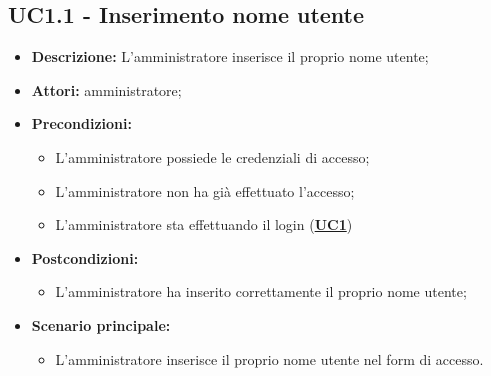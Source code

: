 \documentclass[5pt]{article}
\begin{document}
\subsection{UC1.1 - Inserimento nome utente}
\label{sec:UC1.1}
\begin{itemize}
	\item \textbf{Descrizione:} L’amministratore inserisce il proprio nome utente;
	\item \textbf{Attori:} amministratore;
	\item \textbf{Precondizioni:} 
	\begin{itemize}
		\item L’amministratore possiede le credenziali di accesso;
		\item L’amministratore non ha già effettuato l’accesso;
		\item L’amministratore sta effettuando il login (\hyperref[sec:UC1]{\textbf{UC1}})
	\end{itemize}
	\item \textbf{Postcondizioni:} 
	\begin{itemize}
		\item L’amministratore ha inserito correttamente il proprio nome utente;
	\end{itemize}
	\item \textbf{Scenario principale:} 
	\begin{itemize}
		\item L’amministratore inserisce il proprio nome utente nel form di accesso.
	\end{itemize}
\end{itemize}
\end{document}

